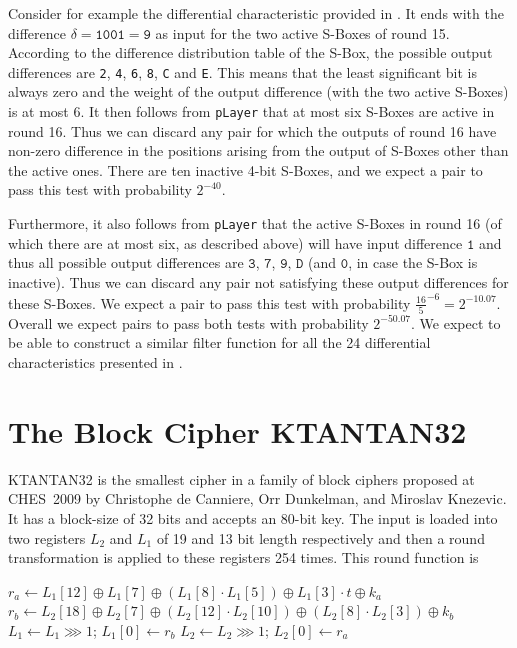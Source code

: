 Consider for example the differential characteristic provided in \cite{present-dc:africacrypt}. It ends with the difference $\delta = \texttt{1001} = \texttt{9}$ as input for the two active S-Boxes of round 15. According to the difference distribution table of the \PRESENT S-Box, the possible output differences are \texttt{2}, \texttt{4}, \texttt{6}, \texttt{8}, \texttt{C} and \texttt{E}. This means that the least significant bit is always zero and the weight of the output difference (with the two active S-Boxes) is at most 6. It then follows from \texttt{pLayer} that at most six S-Boxes are active in round 16. Thus we can discard any pair for which the outputs of round 16 have non-zero difference in the positions arising from the output of S-Boxes other than the active ones. There are ten inactive 4-bit S-Boxes, and we expect a pair to pass this test with probability $2^{-40}$.

Furthermore, it also follows from \texttt{pLayer} that the active S-Boxes in round 16 (of which there are at most six, as described above) will have input difference $\texttt{1}$ and thus all possible output differences are $\texttt{3}$, $\texttt{7}$, $\texttt{9}$, $\texttt{D}$ (and $\texttt{0}$, in case the S-Box is inactive). Thus we can discard any pair not satisfying these output differences for these S-Boxes. We expect a pair to pass this test with probability $\frac{16}{5}^{-6} = 2^{-10.07}$. Overall we expect pairs to pass both tests with probability $2^{-50.07}$. We expect to be able to construct a similar filter function for all the 24 differential characteristics presented in \cite{present-differentials}.

\section{The Block Cipher KTANTAN32}
\label{sec:ktantan32}
KTANTAN32 \cite{CDK09} is the smallest cipher in a family of block ciphers proposed at CHES~2009 by Christophe de Canniere, Orr Dunkelman, and Miroslav Knezevic. It has a block-size of 32 bits and accepts an 80-bit key. The input is loaded into two registers $L_2$ and $L_1$ of 19 and 13 bit length respectively and then a round transformation is applied to these registers 254 times. This round function is
\begin{algorithm}
$r_a \longleftarrow L_1[12] \oplus L_1[7] \oplus (L_1[8] \cdot L_1[5]) \oplus L_1[3] \cdot t \oplus k_a$\;
$r_b \longleftarrow L_2[18] \oplus L_2[7] \oplus (L_2[12] \cdot L_2[10]) \oplus (L_2[8] \cdot L_2[3]) \oplus k_b$\;
$L_1 \longleftarrow L_1 \ggg 1$; $L_1[0] \longleftarrow r_b$\;
$L_2 \longleftarrow L_2 \ggg 1$; $L_2[0] \longleftarrow r_a$\;
\end{algorithm}

